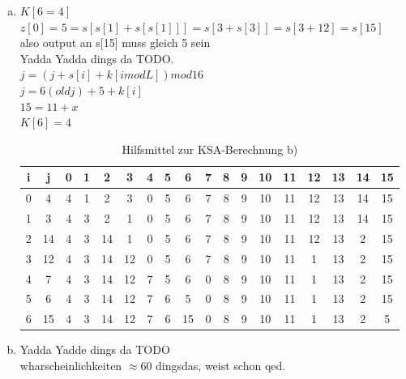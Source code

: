 \documentclass[12pt.twoside,a4paper,notitlepage]{article}
\begin{document}
\begin{enumerate}[a)]
\item $K[6=4]$\\
$z[0]=5=s[s[1]+s[s[1]]]=s[3+s[3]]=s[3+12]=s[15]$\\
also output an s[15] muss gleich 5 sein\\
Yadda Yadda dings da TODO. \\
$j = (j + s[i] + k[i mod L]) mod 16 $\\
$j = 6(old j) + 5 + k[i]$ \\
$15 = 11 + x$\\
$K[6] = 4 $
\begin{table}[h]
\centering
\begin{tabular}{|c|c||c|c|c|c|c|c|c|c|c|c|c|c|c|c|c|c|}
\hline
i & j & 0 & 1 & 2 & 3 & 4 & 5 & 6 & 7 & 8 & 9 & 10 & 11 & 12 & 13 & 14 & 15 \\
\hline
0 & 4 & 4 & 1 & 2 & 3 & 0 & 5 & 6 & 7 & 8 & 9 & 10 & 11 & 12 & 13 & 14 & 15 \\
\hline
1 & 3 & 4 & 3 & 2 & 1 & 0 & 5 & 6 & 7 & 8 & 9 & 10 & 11 & 12 & 13 & 14 & 15 \\
\hline
2 & 14 & 4 & 3 & 14 & 1 & 0 & 5 & 6 & 7 & 8 & 9 & 10 & 11 & 12 & 13 & 2 & 15 \\
\hline
3 & 12 & 4 & 3 & 14 & 12 & 0 & 5 & 6 & 7 & 8 & 9 & 10 & 11 & 1 & 13 & 2 & 15 \\
\hline
4 & 7 & 4 & 3 & 14 & 12 & 7 & 5 & 6 & 0 & 8 & 9 & 10 & 11 & 1 & 13 & 2 & 15 \\
\hline
5 & 6 & 4 & 3 & 14 & 12 & 7 & 6 & 5 & 0 & 8 & 9 & 10 & 11 & 1 & 13 & 2 & 15 \\
\hline
6 & 15 & 4 & 3 & 14 & 12 & 7 & 6 & 15 & 0 & 8 & 9 & 10 & 11 & 1 & 13 & 2 & 5 \\
\hline
\end{tabular}
\caption{Hilfsmittel zur KSA-Berechnung b)}
\label{tab:ksa}
\end{table}

\item Yadda Yadde dings da TODO\\
wharscheinlichkeiten $\approx  60$ dingsdas, weist schon qed.

\end{enumerate}
\end{document}
